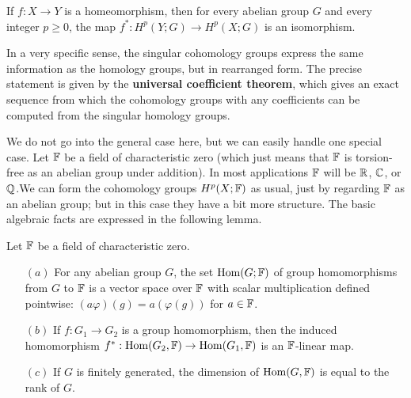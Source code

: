 \begin{corollary}
If $f:X\to Y$ is a homeomorphism, then for every abelian group $G$ and every integer $p\geq0$, the map
$f^*:H^p(Y;G)\to H^p(X;G)$ is an isomorphism.
\end{corollary}
In a very specific sense, the singular cohomology groups express the same information as the homology groups, but in rearranged form. The precise statement is given by the \textbf{universal coefficient theorem}, which gives an exact sequence from which the cohomology groups with any coefficients can be computed from the
singular homology groups.\par
We do not go into the general case here, but we can easily handle one special case. Let $\mathbb{F}$ be a field of characteristic zero (which just means that $\mathbb{F}$ is torsion-free as an abelian group under addition). In most applications $\mathbb{F}$ will be $\mathbb{R}$, $\mathbb{C}$, or $\mathbb{Q}$.We can form the cohomology groups $H^p(X;\mathbb{F})$ as usual, just by regarding $\mathbb{F}$ as an abelian group; but in this case they have a bit more structure. The basic algebraic facts are expressed in the following lemma.
\begin{lemma}\label{Hom lem}
Let $\mathbb{F}$ be a field of characteristic zero.
\begin{itemize}
\item[$(a)$]For any abelian group $G$, the set $\mathrm{Hom}(G;\mathbb{F})$ of group homomorphisms from $G$ to $\mathbb{F}$ is a vector space over $\mathbb{F}$ with scalar multiplication defined pointwise: $(a\varphi)(g)=a(\varphi(g))$ for $a\in\mathbb{F}$.
\item[$(b)$]If $f:G_1\to G_2$ is a group homomorphism, then the induced homomorphism $f^*:\mathrm{Hom}(G_2,\mathbb{F})\to\mathrm{Hom}(G_1,\mathbb{F})$ is an $\mathbb{F}$-linear map.
\item[$(c)$]If $G$ is finitely generated, the dimension of $\mathrm{Hom}(G,\mathbb{F})$ is equal to the rank of $G$.
\end{itemize}
\end{lemma}
